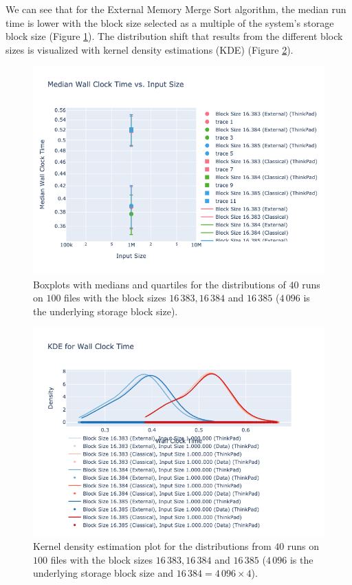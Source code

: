 \documentclass[twocolumn]{article}
\begin{document}
We can see that for the External Memory Merge Sort algorithm, the median run time is lower with the block size selected as a multiple of the system's storage block size 
(Figure \ref{fig:visualization_multiples_block_size.png}).
The distribution shift that results from the different block sizes is visualized with kernel density estimations (KDE) (Figure \ref{fig:kde_plot_multiples_block_size.png}).
\begin{figure}
	\centering
	\includegraphics[width=0.8 \textwidth]{./res/visualization_multiples_block_size.png}
	\caption{Boxplots with medians and quartiles for the distributions of \( 40 \) runs on \( 100 \) files with the block sizes \( 16\,383, 16\,384 \) and \( 16\,385\) (\(4\,096\) is 
	the underlying storage block size).}
	\label{fig:visualization_multiples_block_size.png}
\end{figure}
\begin{figure}
	\centering
	\includegraphics[width=0.8 \textwidth]{./res/kde_plot_multiples_block_size.png}
	\caption{Kernel density estimation plot for the distributions from \( 40 \) runs on \( 100 \) files with the block sizes \( 16\,383, 16\,384 \) and \( 16\,385 \) (\(4\,096\) is the underlying storage block size and 
	\( 16\,384 = 4\,096 \times 4 \)).}
	\label{fig:kde_plot_multiples_block_size.png}
\end{figure}
\end{document}
